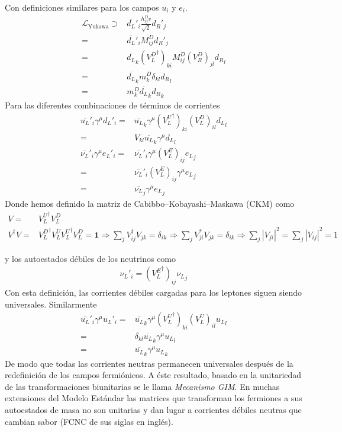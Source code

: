 \begin{frame}
Con definiciones similares para los campos $u_i$ y $e_i$.
\begin{align}
\mathcal{L}_{\text{Yukawa}}\supset&\overline{d_L}'_i\frac{h_{ij}^Dv}{\sqrt{2}} {d_R}'_j\nonumber\\
=&\overline{d_L}'_iM^D_{ij} {d_R}'_j\nonumber\\
=&\overline{d_L}_k({V^D_L}^\dagger)_{ki}M^D_{ij}(V^D_R)_{jl} {d_R}_l\nonumber\\
=&\overline{d_L}_km^D_k\delta_{kl} {d_R}_l\nonumber\\
=&m^D_k\overline{d_L}_k{d_R}_k
\end{align}
Para las diferentes combinaciones de términos de corrientes
\begin{align}
  \overline{u_L}'_i \gamma^\mu{d_L}'_i=&\overline{u_L}_k\gamma^\mu({V^U_L}^\dagger)_{ki}(V^D_L)_{il} {d_L}_l\nonumber\\
  =&V_{kl}\overline{u_L}_k\gamma^\mu{d_L}_l\nonumber\\
  \overline{\nu_L}'_i\gamma^\mu {e_L}'_i=&\overline{\nu_L}'_i\gamma^\mu(V^E_L)_{ij} {e_L}_j\nonumber\\
  =&\overline{\nu_L}'_i(V^E_L)_{ij}\gamma^\mu {e_L}_j\nonumber\\
  =&\overline{\nu_L}_j\gamma^\mu{e_L}_j
\end{align}
Donde hemos definido la matriz de Cabibbo--Kobayashi--Maskawa (CKM) como
\begin{align}
  \label{eq:230qft}
  V=&{V^U_L}^\dagger V^D_L\nonumber\\
  V^\dagger V=&{V^D_L}^\dagger{V^U_L}{V^U_L}^\dagger V^D_L=\mathbf{1}\Rightarrow \sum_jV^\dagger_{ij}V_{jk}=\delta_{ik}\Rightarrow\sum_jV^*_{ji}V_{jk}=\delta_{ik}\Rightarrow\sum_j|V_{ji}|^2=\sum_j|V_{ij}|^2=1
\end{align}

y los autoestados débiles de los neutrinos como
\begin{align}
  {\nu_L}'_i=({V^E_L}^\dagger)_{ij}{\nu_L}_j
\end{align}
Con esta definición, las corrientes débiles cargadas para los leptones siguen siendo universales. Similarmente
\begin{align}
   \overline{u_L}'_i \gamma^\mu{u_L}'_i=&\overline{u_L}_k\gamma^\mu({V^U_L}^\dagger)_{ki}(V^U_L)_{il} {u_L}_l\nonumber\\
  =&\delta_{kl}\overline{u_L}_k \gamma^\mu{u_L}_l\nonumber\\
  =&\overline{u_L}_k\gamma^\mu {u_L}_k
 \end{align}
De modo que todas las corrientes neutras permanecen universales después de la redefinición de los campos fermiónicos. A éste resultado, basado en la unitariedad de las transformaciones biunitarias se le llama \emph{Mecanismo GIM}. En muchas extensiones del Modelo Estándar las matrices que transforman los fermiones a sus autoestados de masa no son unitarias y dan lugar a corrientes débiles neutras que cambian sabor (FCNC de sus siglas en inglés). 


\end{frame}
